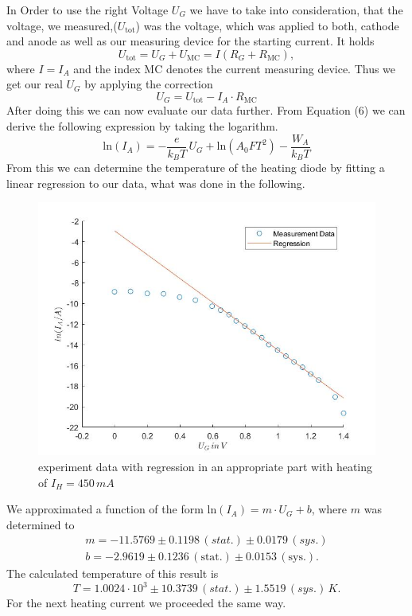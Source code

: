 \documentclass[a4paper, 12pt]{scrartcl}
\begin{document}
In Order to use the right Voltage $U_G$ we have to take into consideration, that the voltage, we measured,($U_\text{tot}$) was the voltage, which was applied to both, cathode and anode as well as our measuring device for the starting current. It holds 
\begin{equation*}U_\text{tot}=U_G+U_\text{MC}=I\left(R_G+R_\text{MC}\right),\end{equation*}
where $I=I_A$ and the index MC denotes the current measuring device. Thus we get our real $U_G$ by applying the correction
\begin{equation*}U_G=U_\text{tot}-I_A\cdot{R_\text{MC}}\end{equation*}
After doing this we can now evaluate our data further. From Equation (6) we can derive the following expression by taking the logarithm.
\begin{equation*}\text{ln}(I_A)=-\frac{e}{k_BT}\,U_G+\text{ln}\left(A_0FT^2\right)-\frac{W_A}{k_BT}\end{equation*}
From this we can determine the temperature of the heating diode by fitting a linear regression to our data, what was done in the following.
\begin{figure}[H]\includegraphics[scale=0.65]{450 Bild}\caption{experiment data with regression in an appropriate part with heating of $I_H=450\,mA$}\end{figure}
We approximated a function of the form $\text{ln}(I_A)=m\cdot{U_G}+b$, where $m$ was determined to 
\begin{gather*}m=-11.5769\pm0.1198\,(stat.)\pm0.0179\,(sys.)\\
b=-2.9619\pm0.1236\,(\text{stat.})\pm0.0153\,(\text{sys.}).\end{gather*} 
The calculated temperature of this result is 
\begin{equation*}T=1.0024\cdot10^3\pm10.3739\,(stat.)\pm1.5519\,(sys.)\,K.\end{equation*}
For the next heating current we proceeded the same way.
\end{document}
